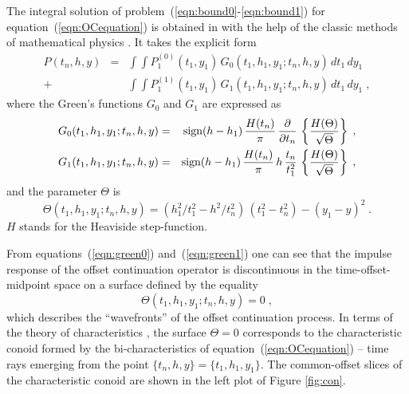 The integral solution of problem~(\ref{eqn:bound0}-\ref{eqn:bound1})
for equation~(\ref{eqn:OCequation}) is obtained in with the help of
the classic methods of mathematical physics
\cite[]{me,Fomel.sepphd.107}. It takes the explicit form
\begin{eqnarray}
P(t_n,h,y) & = &
\int\!\!\int P^{(0)}_1(t_1,y_1)\,G_0(t_1,h_1,y_1;t_n,h,y)\,dt_1\,dy_1
\nonumber \\ 
+ & & 
\int\!\!\int P^{(1)}_1(t_1,y_1)\,G_1(t_1,h_1,y_1;t_n,h,y)\,dt_1\,dy_1\;,
\label{eqn:integral} 
\end{eqnarray}
where the Green's functions $G_0$ and $G_1$ are expressed as
\begin{eqnarray}
G_0(t_1,h_1,y_1;t_n,h,y) & = & \mbox{sign}(h-h_1)\,{H(t_n) \over \pi}\,
{\partial \over \partial t_n}\,\left\{
H(\Theta) \over 
\sqrt{\Theta}\right\}\;,
\label{eqn:green0} \\
G_1(t_1,h_1,y_1;t_n,h,y) & = & \mbox{sign}(h-h_1)\,
{H(t_n) \over \pi}\,h\,
{t_n \over t_1^2}\,\left\{
H(\Theta) \over 
\sqrt{\Theta}\right\}\;,
\label{eqn:green1} 
\end{eqnarray}
and the parameter $\Theta$ is
\begin{equation}
\Theta(t_1,h_1,y_1;t_n,h,y)  = 
\left(h_1^2/t_1^2-h^2/t_n^2\right)\,\left(t_1^2-t_n^2\right)-
\left(y_1-y\right)^2\;.
\label{eqn:gamma}
\end{equation}
$H$ stands for the Heaviside step-function. 
 
From equations~(\ref{eqn:green0}) and~(\ref{eqn:green1}) one can see
that the impulse response of the offset continuation operator is
discontinuous in the time-offset-midpoint space on a surface defined
by the equality
\begin{equation}
\Theta(t_1,h_1,y_1;t_n,h,y)  = 0\;,
\label{eqn:conoid}
\end{equation}
which describes the ``wavefronts'' of the offset continuation process.
In terms of the theory of characteristics \cite[]{kurant}, the surface
$\Theta=0$ corresponds to the characteristic conoid formed by the
bi-characteristics of equation~(\ref{eqn:OCequation}) -- time rays
emerging from the point $\{t_n,h,y\}=\{t_1,h_1,y_1\}$. The
common-offset slices of the characteristic conoid are shown in the
left plot of Figure \ref{fig:con}.


